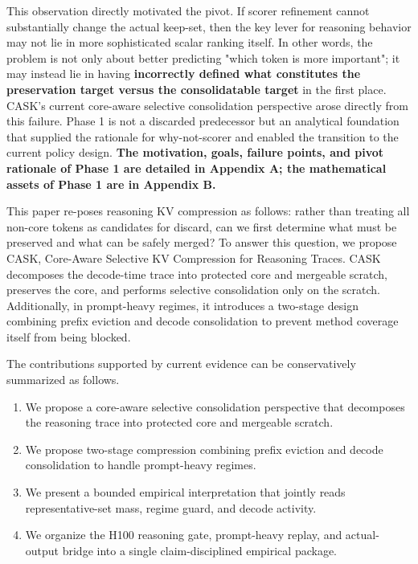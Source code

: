 This observation directly motivated the pivot. If scorer refinement cannot substantially change the actual keep-set, then the key lever for reasoning behavior may not lie in more sophisticated scalar ranking itself. In other words, the problem is not only about better predicting "which token is more important"; it may instead lie in having \textbf{incorrectly defined what constitutes the preservation target versus the consolidatable target} in the first place. CASK's current core-aware selective consolidation perspective arose directly from this failure. Phase 1 is not a discarded predecessor but an analytical foundation that supplied the rationale for why-not-scorer and enabled the transition to the current policy design. \textbf{The motivation, goals, failure points, and pivot rationale of Phase 1 are detailed in Appendix A; the mathematical assets of Phase 1 are in Appendix B.}


This paper re-poses reasoning KV compression as follows: rather than treating all non-core tokens as candidates for discard, can we first determine what must be preserved and what can be safely merged? To answer this question, we propose CASK, Core-Aware Selective KV Compression for Reasoning Traces. CASK decomposes the decode-time trace into protected core and mergeable scratch, preserves the core, and performs selective consolidation only on the scratch. Additionally, in prompt-heavy regimes, it introduces a two-stage design combining prefix eviction and decode consolidation to prevent method coverage itself from being blocked.


The contributions supported by current evidence can be conservatively summarized as follows.


\begin{enumerate}
\item We propose a core-aware selective consolidation perspective that decomposes the reasoning trace into protected core and mergeable scratch.
\item We propose two-stage compression combining prefix eviction and decode consolidation to handle prompt-heavy regimes.
\item We present a bounded empirical interpretation that jointly reads representative-set mass, regime guard, and decode activity.
\item We organize the H100 reasoning gate, prompt-heavy replay, and actual-output bridge into a single claim-disciplined empirical package.
\end{enumerate}



